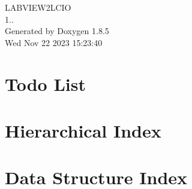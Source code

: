 \documentclass[twoside]{book}
\newcommand{\clearemptydoublepage}{%
  \newpage{\pagestyle{empty}\cleardoublepage}%
}
\begin{document}
\begin{titlepage}
\vspace*{7cm}
\begin{center}%
{\Large L\-A\-B\-V\-I\-E\-W2\-L\-C\-I\-O \\[1ex]\large 1.. }\\
\vspace*{1cm}
{\large Generated by Doxygen 1.8.5}\\
\vspace*{0.5cm}
{\small Wed Nov 22 2023 15:23:40}\\
\end{center}
\end{titlepage}
\clearemptydoublepage
\tableofcontents
\clearemptydoublepage
{}

\chapter{Todo List}
\label{todo}

\chapter{Hierarchical Index}

\chapter{Data Structure Index}

\end{document}
